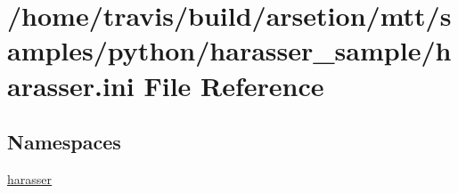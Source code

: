 \hypertarget{harasser_8ini}{\section{/home/travis/build/arsetion/mtt/samples/python/harasser\-\_\-sample/harasser.ini File Reference}
\label{harasser_8ini}
}
\subsection*{Namespaces}
\begin{DoxyCompactItemize}
\item 
\hyperlink{namespaceharasser}{harasser}
\end{DoxyCompactItemize}

